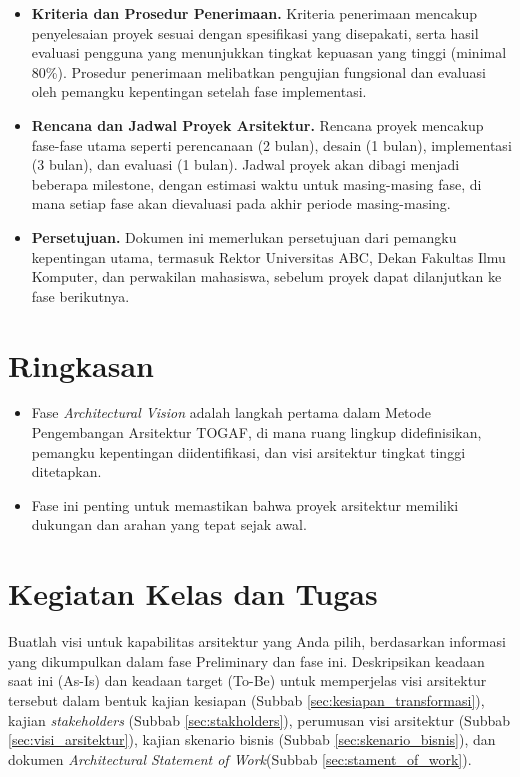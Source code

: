 \begin{itemize}
	\item \textbf{Kriteria dan Prosedur Penerimaan.} 
	Kriteria penerimaan mencakup penyelesaian proyek sesuai dengan spesifikasi yang disepakati, serta hasil evaluasi pengguna yang menunjukkan tingkat kepuasan yang tinggi (minimal 80\%). Prosedur penerimaan melibatkan pengujian fungsional dan evaluasi oleh pemangku kepentingan setelah fase implementasi.
	
	\item \textbf{Rencana dan Jadwal Proyek Arsitektur.} 
	Rencana proyek mencakup fase-fase utama seperti perencanaan (2 bulan), desain (1 bulan), implementasi (3 bulan), dan evaluasi (1 bulan). Jadwal proyek akan dibagi menjadi beberapa milestone, dengan estimasi waktu untuk masing-masing fase, di mana setiap fase akan dievaluasi pada akhir periode masing-masing.
	
	\item \textbf{Persetujuan.} 
	Dokumen ini memerlukan persetujuan dari pemangku kepentingan utama, termasuk Rektor Universitas ABC, Dekan Fakultas Ilmu Komputer, dan perwakilan mahasiswa, sebelum proyek dapat dilanjutkan ke fase berikutnya.
\end{itemize}


\section{Ringkasan}
\begin{itemize}
	\item Fase \textit{Architectural Vision} adalah langkah pertama dalam Metode Pengembangan Arsitektur TOGAF, di mana ruang lingkup didefinisikan, pemangku kepentingan diidentifikasi, dan visi arsitektur tingkat tinggi ditetapkan.
	\item Fase ini penting untuk memastikan bahwa proyek arsitektur memiliki dukungan dan arahan yang tepat sejak awal.
\end{itemize}

\section{Kegiatan Kelas dan Tugas}
Buatlah visi untuk kapabilitas arsitektur yang Anda pilih, berdasarkan informasi yang dikumpulkan dalam fase Preliminary dan fase ini. Deskripsikan keadaan saat ini (As-Is) dan keadaan target (To-Be) untuk memperjelas visi arsitektur tersebut dalam bentuk kajian kesiapan (Subbab \ref{sec:kesiapan_transformasi}), kajian \textit{stakeholders} (Subbab \ref{sec:stakholders}), perumusan visi arsitektur (Subbab \ref{sec:visi_arsitektur}), kajian skenario bisnis (Subbab \ref{sec:skenario_bisnis}), dan dokumen \textit{Architectural Statement of Work}(Subbab \ref{sec:stament_of_work}).
